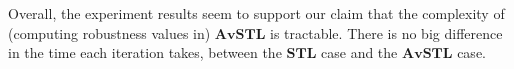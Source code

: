 \documentclass[envcountsect,orivec]{llncs} \usepackage{etex} \usepackage[]{graphicx}
\newcommand{\STL}{\textbf{STL}}
\newcommand{\AvSTL}{\textbf{AvSTL}}
\begin{document}
Overall, the experiment results seem to support our claim that the complexity of
(computing robustness values in) $\AvSTL$ is tractable. There is no big
difference in the time 
each iteration takes, between the $\STL$ case and the $\AvSTL$ case.
\end{document}
